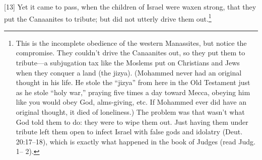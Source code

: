 [13] \textcolor[rgb]{0.00,0.00,1.00}{Yet it came to pass, when the children of Israel were waxen strong, that they put the Canaanites to tribute; but did not utterly drive them out.}\footnote{This is the incomplete obedience of the
western Manassites, but notice the compromise.
They couldn’t drive the Canaanites out, so they
put them to tribute—a subjugation tax like the
Moslems put on Christians and Jews when they
conquer a land (the jizya). (Mohammed never
had an original thought in his life. He stole the
“jizya” from here in the Old Testament just as
he stole “holy war,” praying five times a day
toward Mecca, obeying him like you would
obey God, alms-giving, etc. If Mohammed ever
did have an original thought, it died of
loneliness.) The problem was that wasn’t what
God told them to do: they were to wipe them
out. Just having them under tribute left them
open to infect Israel with false gods and idolatry
(Deut. 20:17–18), which is exactly what
happened in the book of Judges (read Judg. 1–
2).}
